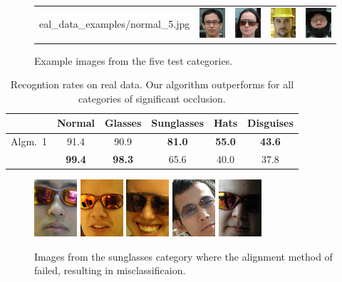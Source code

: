 \begin{figure}
\begin{tabular}{ccccc}
eal_data_examples/normal_5.jpg} & \includegraphics[width=\imagewidth]{figures_iccv/real_data_examples/glasses_5.jpg} & \includegraphics[width=\imagewidth]{figures_iccv/real_data_examples/sunglasses_5.jpg} & \includegraphics[width=\imagewidth]{figures_iccv/real_data_examples/hats_5.jpg} & \includegraphics[width=\imagewidth]{figures_iccv/real_data_examples/disguise_5.jpg}
\end{tabular}
\caption{Example images from the five test categories.} \label{fig:real-data-ex}
\end{figure}

\begin{table}[t]
\centering
\begin{tabular}{|c|c|c|c|c|c|}
\hline
& Normal & Glasses & Sunglasses & Hats & Disguises \\
\hline
Algm.\ 1 & 91.4 & 90.9 & {\bf 81.0} & {\bf 55.0} & {\bf 43.6} \\
\hline
\cite{Wright2009-PAMI} & {\bf 99.4} & {\bf 98.3} & 65.6 & 40.0 & 37.8 \\
\hline
\end{tabular}
\caption{Recogntion rates on real data. Our algorithm outperforms \cite{Wright2009-PAMI} for all categories of significant occlusion.} \label{tab:real-data-rates}
\end{table}

\begin{figure}
\centering
\newcommand{\imagewidth}{.8in}
\includegraphics[width=\imagewidth]{figures_iccv/sunglass_examples/failed/1.png}
\includegraphics[width=\imagewidth]{figures_iccv/sunglass_examples/failed/2.png}
\includegraphics[width= \imagewidth]{figures_iccv/sunglass_examples/failed/3.png}
\includegraphics[width= \imagewidth]{figures_iccv/sunglass_examples/failed/4.png}
\includegraphics[width= \imagewidth]{figures_iccv/sunglass_examples/failed/5.png}
\caption{Images from the sunglasses category where the alignment method of \cite{Wagner2009-CVPR} failed, resulting in misclassificaion.} \label{fig:registration} \vspace{0mm}
\end{figure}



